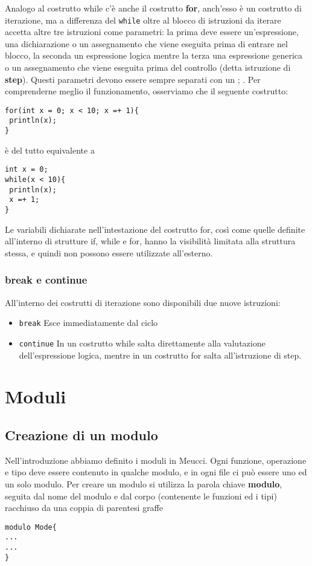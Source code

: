 \documentclass[10pt]{book}%
\newcommand{\e}{\`{e} }
\newcommand{\ac}[1]{\`{#1}}
\newcommand{\code}[1]{\texttt{#1}}
\renewcommand{\emph}[1]{\textbf{#1}}
\newenvironment{codeenv}{
\begin{mdframed}[backgroundcolor=black!20,topline=false,leftline=false,rightline=false,bottomline=false]
}
{\end{mdframed}}
\begin{document}
Analogo al costrutto while c'\e anche il costrutto \emph{for}, anch'esso \e un costrutto di iterazione, ma a differenza del \code{while} oltre al blocco di istruzioni da iterare accetta altre tre istruzioni come parametri: la prima deve essere un'espressione, una dichiarazione o un assegnamento che viene eseguita prima di entrare nel blocco, la seconda un espressione logica mentre la terza una espressione generica o un assegnamento che viene eseguita prima del controllo (detta istruzione di \emph{step}). Questi parametri devono essere sempre separati con un ; . Per comprenderne meglio il funzionamento, osserviamo che il seguente costrutto:
\begin{codeenv}
\begin{verbatim}
for(int x = 0; x < 10; x =+ 1){
 println(x);
}
\end{verbatim}
\end{codeenv}
\e del tutto equivalente a
\begin{codeenv}
\begin{verbatim}
int x = 0;
while(x < 10){
 println(x);
 x =+ 1;
}
\end{verbatim}
\end{codeenv}

Le variabili dichiarate nell'intestazione del costrutto for, cos\ac i come quelle definite all'interno di strutture if, while e for, hanno la visibilit\ac a limitata alla struttura stessa, e quindi non possono essere utilizzate all'esterno.

\subsection{break e continue}
All'interno dei costrutti di iterazione sono disponibili due nuove istruzioni:
\begin{itemize}
\item \code{break} Esce immediatamente dal ciclo
\item \code{continue} In un costrutto while salta direttamente alla valutazione dell'espressione logica, mentre in un costrutto for salta all'istruzione di step.
\end{itemize}

\chapter{Moduli}
\section{Creazione di un modulo}
Nell'introduzione abbiamo definito i moduli in Meucci. Ogni funzione, operazione e tipo deve essere contenuto in qualche modulo, e in ogni file ci pu\ac o essere uno ed un solo modulo. Per creare un modulo si utilizza la parola chiave \emph{modulo}, seguita dal nome del modulo e dal corpo (contenente le funzioni ed i tipi) racchiuso da una coppia di parentesi graffe
\begin{codeenv}
\begin{verbatim}
modulo Mode{
...
...
}
\end{verbatim}
\end{codeenv}
\end{document}
